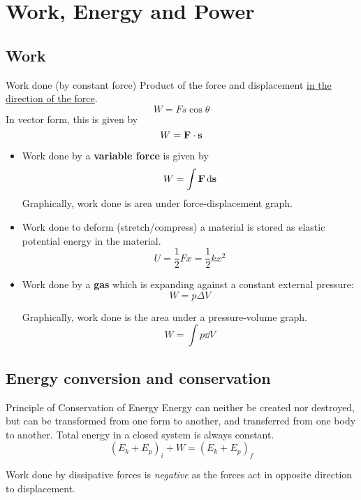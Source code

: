 \section{Work, Energy and Power}
\subsection{Work}
\begin{defn}{Work done (by constant force)}{}
Product of the force and displacement \underline{in the direction of the force}.
\begin{equation}
W=Fs\cos\theta
\end{equation}
In vector form, this is given by
\[ W=\vb{F}\cdot\vb{s} \]
\end{defn} 

\begin{itemize}
\item Work done by a \textbf{variable force} is given by
\begin{equation}
W=\int\vb{F}\dd{\vb{s}}
\end{equation}
Graphically, work done is area under force-displacement graph.

\item Work done to deform (stretch/compress) a material is stored as elastic potential energy in the material.
\begin{equation}
    U = \frac{1}{2}Fx = \frac{1}{2}kx^2
\end{equation}

\item Work done by a \textbf{gas} which is expanding against a constant external pressure: 
\begin{equation}
W = p \Delta V
\end{equation}

Graphically, work done is the area under a pressure-volume graph.
\[ W = \int p \dd{V} \]
\end{itemize}
\pagebreak

\subsection{Energy conversion and conservation}
\begin{defn}{Principle of Conservation of Energy}{}
Energy can neither be created nor destroyed, but can be transformed from one form to another, and transferred from one body to another. Total energy in a closed system is always constant.
 \begin{equation}
(E_k+E_p)_i + W = (E_k+E_p)_f
\end{equation}
\begin{remark}
Work done by dissipative forces is \emph{negative} as the forces act in opposite direction to displacement.
\end{remark}
\end{defn}

